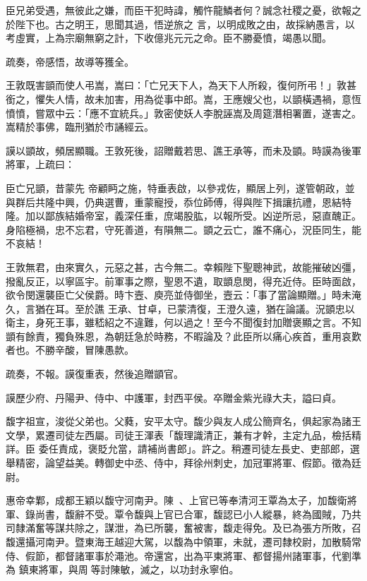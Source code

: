 \begin{pinyinscope}
 臣兄弟受遇，無彼此之嫌，而臣干犯時諱，觸忤龍鱗者何？誠念社稷之憂，欲報之於陛下也。古之明王，思聞其過，悟逆旅之
 言，以明成敗之由，故採納愚言，以考虛實，上為宗廟無窮之計，下收億兆元元之命。臣不勝憂憤，竭愚以聞。



 疏奏，帝感悟，故導等獲全。



 王敦既害顗而使人弔嵩，嵩曰：「亡兄天下人，為天下人所殺，復何所弔！」敦甚銜之，懼失人情，故未加害，用為從事中郎。嵩，王應嫂父也，以顗橫遇禍，意恆憤憤，嘗眾中云：「應不宜統兵。」敦密使妖人李脫誣嵩及周筵潛相署置，遂害之。嵩精於事佛，臨刑猶於市誦經云。



 謨以顗故，頻居顯職。王敦死後，詔贈戴若思、譙王承等，而未及顗。時謨為後軍將軍，上疏曰：



 臣亡兄顗，昔蒙先
 帝顧眄之施，特垂表啟，以參戎佐，顯居上列，遂管朝政，並與群后共隆中興，仍典選曹，重蒙寵授，忝位師傅，得與陛下揖讓抗禮，恩結特隆。加以鄙族結婚帝室，義深任重，庶竭股肱，以報所受。凶逆所忌，惡直醜正。身陷極禍，忠不忘君，守死善道，有隕無二。顗之云亡，誰不痛心，況臣同生，能不哀結！



 王敦無君，由來實久，元惡之甚，古今無二。幸賴陛下聖聰神武，故能摧破凶彊，撥亂反正，以寧區宇。前軍事之際，聖恩不遺，取顗息閔，得充近侍。臣時面啟，欲令閔還襲臣亡父侯爵。時卞壼、庾亮並侍御坐，壼云：「事了當論顯贈。」時未淹久，言猶在耳。至於譙
 王承、甘卓，已蒙清復，王澄久遠，猶在論議。況顗忠以衛主，身死王事，雖嵇紹之不違難，何以過之！至今不聞復封加贈褒顯之言。不知顗有餘責，獨負殊恩，為朝廷急於時務，不暇論及？此臣所以痛心疾首，重用哀歎者也。不勝辛酸，冒陳愚款。



 疏奏，不報。謨復重表，然後追贈顗官。



 謨歷少府、丹陽尹、侍中、中護軍，封西平侯。卒贈金紫光祿大夫，謚曰貞。



 馥字祖宣，浚從父弟也。父蕤，安平太守。馥少與友人成公簡齊名，俱起家為諸王文學，累遷司徒左西屬。司徒王渾表「馥理識清正，兼有才幹，主定九品，檢括精詳。臣
 委任責成，褒貶允當，請補尚書郎」。許之。稍遷司徒左長史、吏部郎，選舉精密，論望益美。轉御史中丞、侍中，拜徐州刺史，加冠軍將軍、假節。徵為廷尉。



 惠帝幸鄴，成都王穎以馥守河南尹。陳、上官已等奉清河王覃為太子，加馥衛將軍、錄尚書，馥辭不受。覃令馥與上官已合軍，馥認已小人縱暴，終為國賊，乃共司隸滿奮等謀共除之，謀泄，為已所襲，奮被害，馥走得免。及已為張方所敗，召馥還攝河南尹。暨東海王越迎大駕，以馥為中領軍，未就，遷司隸校尉，加散騎常侍、假節，都督諸軍事於澠池。帝還宮，出為平東將軍、都督揚州諸軍事，代劉準為
 鎮東將軍，與周等討陳敏，滅之，以功封永寧伯。




\end{pinyinscope}
